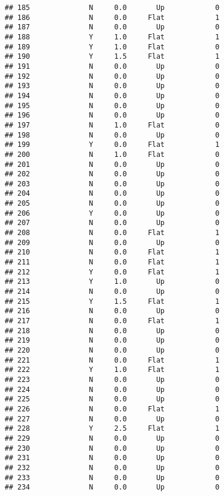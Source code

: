 \documentclass[
]{article}
\begin{document}
\begin{verbatim}
## 185              N     0.0       Up            0
## 186              N     0.0     Flat            1
## 187              N     0.0       Up            0
## 188              Y     1.0     Flat            1
## 189              Y     1.0     Flat            0
## 190              Y     1.5     Flat            1
## 191              N     0.0       Up            0
## 192              N     0.0       Up            0
## 193              N     0.0       Up            0
## 194              N     0.0       Up            0
## 195              N     0.0       Up            0
## 196              N     0.0       Up            0
## 197              N     1.0     Flat            0
## 198              N     0.0       Up            0
## 199              Y     0.0     Flat            1
## 200              N     1.0     Flat            0
## 201              N     0.0       Up            0
## 202              N     0.0       Up            0
## 203              N     0.0       Up            0
## 204              N     0.0       Up            0
## 205              N     0.0       Up            0
## 206              Y     0.0       Up            0
## 207              N     0.0       Up            0
## 208              N     0.0     Flat            1
## 209              N     0.0       Up            0
## 210              N     0.0     Flat            1
## 211              N     0.0     Flat            1
## 212              Y     0.0     Flat            1
## 213              Y     1.0       Up            0
## 214              N     0.0       Up            0
## 215              Y     1.5     Flat            1
## 216              N     0.0       Up            0
## 217              N     0.0     Flat            1
## 218              N     0.0       Up            0
## 219              N     0.0       Up            0
## 220              N     0.0       Up            0
## 221              N     0.0     Flat            1
## 222              Y     1.0     Flat            1
## 223              N     0.0       Up            0
## 224              N     0.0       Up            0
## 225              N     0.0       Up            0
## 226              N     0.0     Flat            1
## 227              N     0.0       Up            0
## 228              Y     2.5     Flat            1
## 229              N     0.0       Up            0
## 230              N     0.0       Up            0
## 231              N     0.0       Up            0
## 232              N     0.0       Up            0
## 233              N     0.0       Up            0
## 234              N     0.0       Up            0

\end{verbatim}
\end{document}
